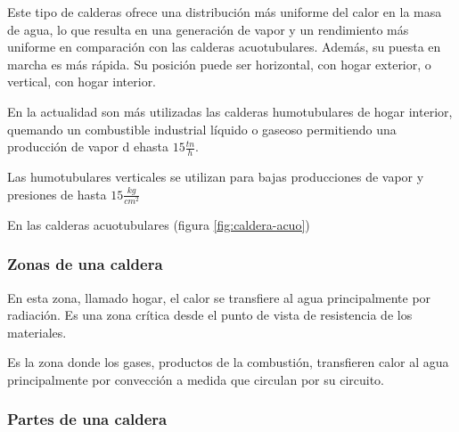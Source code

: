 Este tipo de calderas ofrece una distribución más uniforme del calor en la masa de agua, lo que resulta en una generación de vapor y un rendimiento más uniforme en comparación con las calderas acuotubulares. Además, su puesta en marcha es más rápida. Su posición puede ser horizontal, con hogar exterior, o vertical, con hogar interior.



En la actualidad son más utilizadas las calderas humotubulares de hogar interior, quemando un combustible industrial líquido o gaseoso permitiendo una producción de vapor d ehasta $15\frac{tn}{h}$.


Las humotubulares verticales se utilizan para bajas producciones de vapor y presiones de hasta $15\frac{kg}{cm^2}$



En las calderas acuotubulares (figura \ref{fig:caldera-acuo})

\subsubsection{Zonas de una caldera}


En esta zona, llamado hogar, el calor se transfiere al agua principalmente por radiación. Es una zona crítica desde el punto de vista de resistencia de los materiales. 


Es la zona donde los gases, productos de la combustión, transfieren calor al agua principalmente por convección a medida que circulan por su circuito.

\subsubsection{Partes de una caldera}

